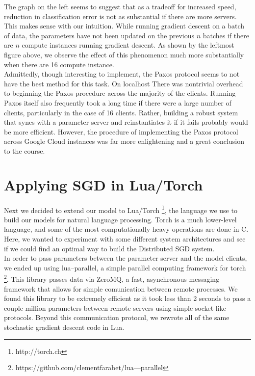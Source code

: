 \documentclass[11pt]{article}
\begin{document}
\noindent The graph on the left seems to suggest that as a tradeoff for increased speed, reduction in classification error is not as substantial if there are more servers. This makes sense with our intuition. While running gradient descent on a batch of data, the parameters have not been updated on the previous $n$ batches if there are $n$ compute instances running gradient descent. As shown by the leftmost figure above, we observe the effect of this phenomenon much more substantially when there are 16 compute instance.\\


\noindent Admittedly, though interesting to implement, the Paxos protocol seems to not have the best method for this task. On localhost There was nontrivial overhead to beginning the Paxos procedure across the majority of the clients. Running Paxos itself also frequently took a long time if there were a large number of clients, particularly in the case of 16 clients. Rather, building a robust system that syncs with a parameter server and reinstantiates it if it fails probably would be more efficient. However, the procedure of implementing the Paxos protocol across Google Cloud instances was far more enlightening and a great conclusion to the course. 

\section{Applying SGD in Lua/Torch}

\noindent Next we decided to extend our model to Lua/Torch \footnote{http://torch.ch}, the language we use to build our models for natural language processing. Torch is a much lower-level language, and some of the most computationally heavy operations are done in C. Here, we wanted to experiment with some different system architectures and see if we could find an optimal way to build the Distributed SGD system.\\

\noindent In order to pass parameters between the parameter server and the model clients, we ended up using lua--parallel, a simple parallel computing framework for torch \footnote{https://github.com/clementfarabet/lua---parallel}. This library passes data via ZeroMQ, a fast, asynchronous messaging framework that allows for simple comunication between remote processes. We found this library to be extremely efficient as it took less than 2 seconds to pass a couple million parameters between remote servers using simple socket-like protocols. Beyond this communication protocol, we rewrote all of the same stochastic gradient descent code in Lua.\\ 
\end{document}
